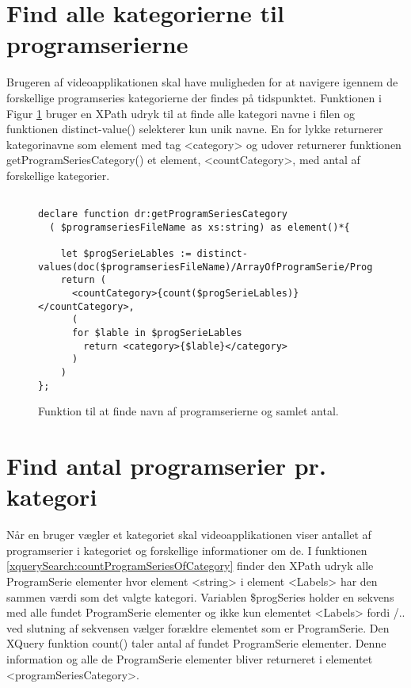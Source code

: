
\section{Find alle kategorierne til programserierne}
Brugeren af videoapplikationen skal have muligheden for at navigere igennem de forskellige 
programseries kategorierne der findes på tidspunktet. Funktionen i Figur \ref{xquerySearch:getProgramSeriesCategory} bruger en XPath udryk til at finde alle kategori navne i filen og funktionen distinct-value() selekterer kun unik navne. En for lykke returnerer kategorinavne som element med tag <category> og udover returnerer funktionen getProgramSeriesCategory() et element, <countCategory>, med antal af forskellige kategorier. 


\begin{figure}[ht]
\begin{lstlisting}[style=FAKE_XQUERY, language=XQUERY]

declare function dr:getProgramSeriesCategory
  ( $programseriesFileName as xs:string) as element()*{
    
    let $progSerieLables := distinct-values(doc($programseriesFileName)/ArrayOfProgramSerie/ProgramSerie/Labels/string/text())
    return (
      <countCategory>{count($progSerieLables)}</countCategory>,
      (
      for $lable in $progSerieLables
        return <category>{$lable}</category>
      )
    )
};

\end{lstlisting}
\caption{Funktion til at finde navn af programserierne og samlet antal.}
\label{xquerySearch:getProgramSeriesCategory}
\end{figure}



\section{Find antal programserier pr. kategori}
Når en bruger vægler et kategoriet skal videoapplikationen viser antallet af programserier i kategoriet og forskellige informationer om de. I funktionen \ref{xquerySearch:countProgramSeriesOfCategory} finder den XPath udryk alle ProgramSerie elementer hvor element <string> i element <Labels> har den sammen værdi som det valgte kategori. Variablen \$progSeries holder en sekvens med alle fundet ProgramSerie elementer og ikke kun elementet <Labels> fordi /.. ved slutning af sekvensen vælger forældre elementet som er ProgramSerie. Den XQuery funktion count() taler antal af fundet ProgramSerie elementer. Denne information og alle de ProgramSerie elementer bliver returneret i elementet <programSeriesCategory>.

